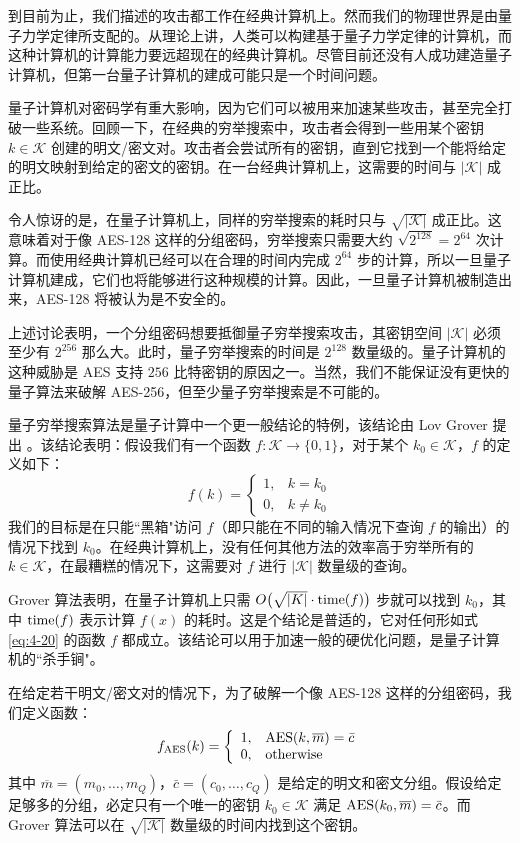 到目前为止，我们描述的攻击都工作在经典计算机上。然而我们的物理世界是由量子力学定律所支配的。从理论上讲，人类可以构建基于量子力学定律的计算机，而这种计算机的计算能力要远超现在的经典计算机。尽管目前还没有人成功建造量子计算机，但第一台量子计算机的建成可能只是一个时间问题。

量子计算机对密码学有重大影响，因为它们可以被用来加速某些攻击，甚至完全打破一些系统。回顾一下，在经典的穷举搜索中，攻击者会得到一些用某个密钥 $k\in\mathcal{K}$ 创建的明文/密文对。攻击者会尝试所有的密钥，直到它找到一个能将给定的明文映射到给定的密文的密钥。在一台经典计算机上，这需要的时间与 $|\mathcal{K}|$ 成正比。


\begin{snote}[量子穷举搜索。]
令人惊讶的是，在量子计算机上，同样的穷举搜索的耗时只与 $\sqrt{|\mathcal{K}|}$ 成正比。这意味着对于像 AES-128 这样的分组密码，穷举搜索只需要大约 $\sqrt{2^{128}}=2^{64}$ 次计算。而使用经典计算机已经可以在合理的时间内完成 $2^{64}$ 步的计算，所以一旦量子计算机建成，它们也将能够进行这种规模的计算。因此，一旦量子计算机被制造出来，AES-128 将被认为是不安全的。

上述讨论表明，一个分组密码想要抵御量子穷举搜索攻击，其密钥空间 $|\mathcal{K}|$ 必须至少有 $2^{256}$ 那么大。此时，量子穷举搜索的时间是 $2^{128}$ 数量级的。量子计算机的这种威胁是 AES 支持 $256$ 比特密钥的原因之一。当然，我们不能保证没有更快的量子算法来破解 AES-256，但至少量子穷举搜索是不可能的。
\end{snote}

\begin{snote}[Grover 算法。]
量子穷举搜索算法是量子计算中一个更一般结论的特例，该结论由 Lov Grover 提出 \cite{grover1996fast}。该结论表明：假设我们有一个函数 $f:\mathcal{K}\to\{0,1\}$，对于某个 $k_0\in\mathcal{K}$，$f$ 的定义如下：
\begin{equation}\label{eq:4-20}
f(k)=\left\{
\begin{array}{ll}
1, & k=k_0\\
0, & k\neq k_0
\end{array}
\right.
\end{equation}
我们的目标是在只能``黑箱"访问 $f$（即只能在不同的输入情况下查询 $f$ 的输出）的情况下找到 $k_0$。在经典计算机上，没有任何其他方法的效率高于穷举所有的 $k\in\mathcal{K}$，在最糟糕的情况下，这需要对 $f$ 进行 $|\mathcal{K}|$ 数量级的查询。

Grover 算法表明，在量子计算机上只需 $O\big(\sqrt{|K|}\cdot{\rm time}(f)\big)$ 步就可以找到 $k_0$，其中 ${\rm time}(f)$ 表示计算 $f(x)$ 的耗时。这是个结论是普适的，它对任何形如式 \ref{eq:4-20} 的函数 $f$ 都成立。该结论可以用于加速一般的硬优化问题，是量子计算机的``杀手锏"。

在给定若干明文/密文对的情况下，为了破解一个像 AES-128 这样的分组密码，我们定义函数：
\[
f_{\rm AES}(k)=\left\{
\begin{array}{ll}
1, & {\rm AES}(k,\overline m)=\bar c\\
0, & \text{otherwise}
\end{array}
\right.
\]
其中 $\overline m=(m_0,\dots,m_Q)$，$\bar c=(c_0,\dots,c_Q)$ 是给定的明文和密文分组。假设给定足够多的分组，必定只有一个唯一的密钥 $k_0\in\mathcal{K}$ 满足 ${\rm AES}(k_0,\overline m)=\bar c$。而 Grover 算法可以在 $\sqrt{|\mathcal{K}|}$ 数量级的时间内找到这个密钥。
\end{snote}